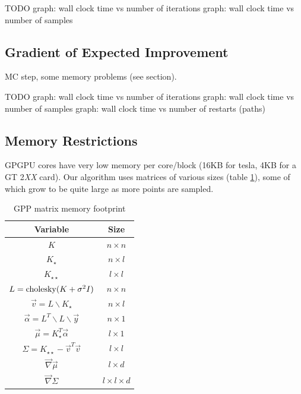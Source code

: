\documentclass[phd,tocprelim]{cornell}
\begin{document}
TODO
graph: wall clock time vs number of iterations
graph: wall clock time vs number of samples

\subsection{Gradient of Expected Improvement}

MC step, some memory problems (see section).

TODO
graph: wall clock time vs number of iterations
graph: wall clock time vs number of samples
graph: wall clock time vs number of restarts (paths)

\subsection{Memory Restrictions} %
\label{sub:Memory Restrictions}

GPGPU cores have very low memory per core/block (16KB for tesla, 4KB for a GT 2{\it XX} card). Our algorithm uses matrices of various sizes (table \ref{EPImemory}), some of which grow to be quite large as more points are sampled.

\begin{table}
    \caption{GPP matrix memory footprint}
    \label{EPImemory}
\begin{center}
    \begin{tabular}{c|c}
    Variable & Size \\
    \hline
    $K$ & $n \times n$ \\
    $K_{\star }$ & $n \times l$ \\
    $K_{\star \star }$ & $l \times l$ \\ 
    $L = {\rm cholesky}(K + \sigma^{2}I) $ & $n \times n$ \\
    $\vec{v} = L \backslash K_{\star }$ & $n \times l$ \\
    $\vec{\alpha} = L^{T} \backslash L \backslash \vec{y}$ & $n \times 1$ \\
    $\vec{\mu} = K_{\star }^{T}\vec{\alpha}$ & $l \times 1$  \\
    $\Sigma = K_{\star \star} - \vec{v}^{T}\vec{v}$ & $l \times l$ \\
    $\vec{\nabla} \vec{\mu}$ & $l \times d$ \\
    $\vec{\nabla} \Sigma$ & $l \times l \times d$
    \end{tabular}
\end{center}
\end{table}
\end{document}
